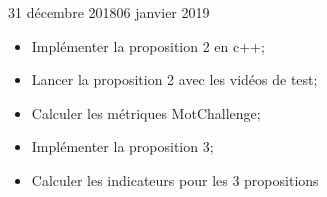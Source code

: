 \documentclass[12pt]{fiche-rd-info}
\begin{document}
\begin{fichesuivi}{31 décembre 2018}{06 janvier 2019}
	\begin{planification}
		\begin{itemize}
			\item Implémenter la proposition 2 en c++;
			\item Lancer la proposition 2 avec les vidéos de test;
			\item Calculer les métriques MotChallenge;
			\item Implémenter la proposition 3;
			\item Calculer les indicateurs pour les 3 propositions
		\end{itemize}
	\end{planification}
\end{fichesuivi}
\end{document}
